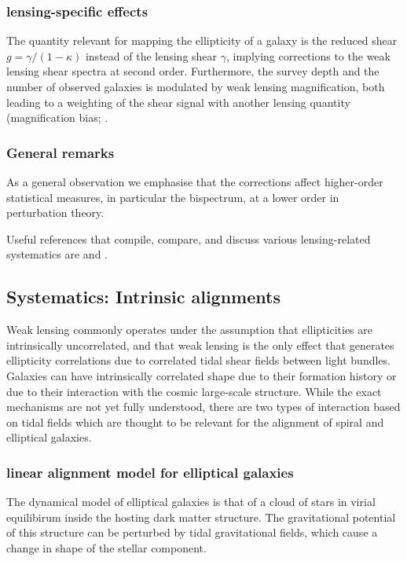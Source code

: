 \subsubsection{lensing-specific effects}
The quantity relevant for mapping the ellipticity of a galaxy is the reduced shear $g = \gamma/(1-\kappa)$ instead of the lensing shear $\gamma$, implying corrections to the weak lensing shear spectra at second order. Furthermore, the survey depth and the number of observed galaxies is modulated by weak lensing magnification, both leading to a weighting of the shear signal with another lensing quantity (magnification bias; \cite{2001MNRAS.326..326H}.

\subsubsection{General remarks}

As a general observation we emphasise that the corrections affect higher-order statistical measures, in particular the bispectrum, at a lower order in perturbation theory.

Useful references that compile, compare, and discuss various lensing-related systematics are \cite{2010A&A...523A..28K}
and \cite{2010PhRvD..81h3002B}.



\subsection{Systematics: Intrinsic alignments}
\label{sec:IA}

Weak lensing commonly operates under the assumption that ellipticities are intrinsically uncorrelated, and that weak lensing is the only effect that generates ellipticity correlations due to correlated tidal shear fields between light bundles. Galaxies can have intrinsically correlated shape due to their formation history or due to their interaction with the cosmic large-scale structure. While the exact mechanisms are not yet fully understood, there are two types of interaction based on tidal fields which are thought to be relevant for the alignment of spiral and elliptical galaxies.

\subsubsection{linear alignment model for elliptical galaxies}
The dynamical model of elliptical galaxies is that of a cloud of stars in virial equilibirum inside the hosting dark matter structure. The gravitational potential of this structure can be perturbed by tidal gravitational fields, which cause a change in shape of the stellar component. 


